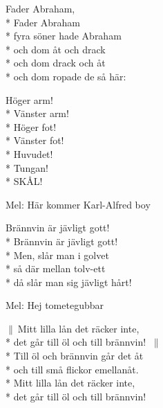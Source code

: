 \begin{SongText}
    \begin{SongVerse}
        Fader Abraham,\\*%
        Fader Abraham\\*%
        fyra söner hade Abraham\\*%
        och dom åt och drack\\*%
        och dom drack och åt\\*%
        och dom ropade de så här:
    \end{SongVerse}
    \begin{SongVerse}
        Höger arm!\\*%
        Vänster arm!\\*%
        Höger fot!\\*%
        Vänster fot!\\*%
        Huvudet!\\*%
        Tungan!\\*%
        SKÅL!
    \end{SongVerse}
\end{SongText}
\begin{SongText}
    \begin{SongInfo}
        Mel: Här kommer Karl-Alfred boy
    \end{SongInfo}
    \begin{SongVerse}
        Brännvin är jävligt gott!\\*%
        Brännvin är jävligt gott!\\*%
        Men, slår man i golvet\\*%
        så där mellan tolv-ett\\*%
        då slår man sig jävligt hårt!
    \end{SongVerse}
\end{SongText}
\begin{SongText}[Studielånet]
    \begin{SongInfo}
        Mel: Hej tometegubbar
    \end{SongInfo}
    \begin{SongVerse}
        $\|\:$Mitt lilla lån det räcker inte,\\*%
        det går till öl och till brännvin! $\:\|$\\*%
        Till öl och brännvin går det åt\\*%
        och till små flickor emellanåt.\\*%
        Mitt lilla lån det räcker inte,\\*%
        det går till öl och till brännvin!
    \end{SongVerse}
\end{SongText}
